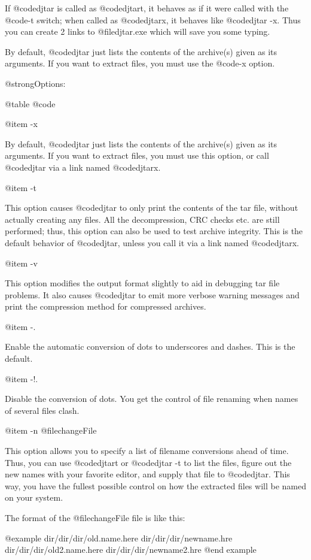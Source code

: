 If @code{djtar} is called as @code{djtart}, it behaves as if it were
called with the @code{-t} switch; when called as @code{djtarx}, it
behaves like @code{djtar -x}.  Thus you can create 2 links to
@file{djtar.exe} which will save you some typing.

By default, @code{djtar} just lists the contents of the archive(s)
given as its arguments.  If you want to extract files, you must use
the @code{-x} option.

@strong{Options:}

@table @code

@item -x

By default, @code{djtar} just lists the contents of the archive(s)
given as its arguments.  If you want to extract files, you must use
this option, or call @code{djtar} via a link named @code{djtarx}.

@item -t

This option causes @code{djtar} to only print the contents of the tar
file, without actually creating any files.  All the decompression, CRC
checks etc. are still performed; thus, this option can also be used to
test archive integrity.  This is the default behavior of
@code{djtar}, unless you call it via a link named @code{djtarx}.

@item -v

This option modifies the output format slightly to aid in debugging tar
file problems.  It also causes @code{djtar} to emit more verbose warning
messages and print the compression method for compressed archives.

@item -.

Enable the automatic conversion of dots to underscores and dashes.  This
is the default.

@item -!.

Disable the conversion of dots.  You get the control of file renaming when
names of several files clash.

@item -n @file{changeFile}

This option allows you to specify a list of filename conversions ahead of
time.  Thus, you can use @code{djtart} or @code{djtar -t} to list the
files, figure out the new names with your favorite editor, and supply that
file to @code{djtar}.  This way, you have the fullest possible control on
how the extracted files will be named on your system.

The format of the @file{changeFile} file is like this:

@example
dir/dir/dir/old.name.here  dir/dir/dir/newname.hre
dir/dir/dir/old2.name.here  dir/dir/dir/newname2.hre
@end example

